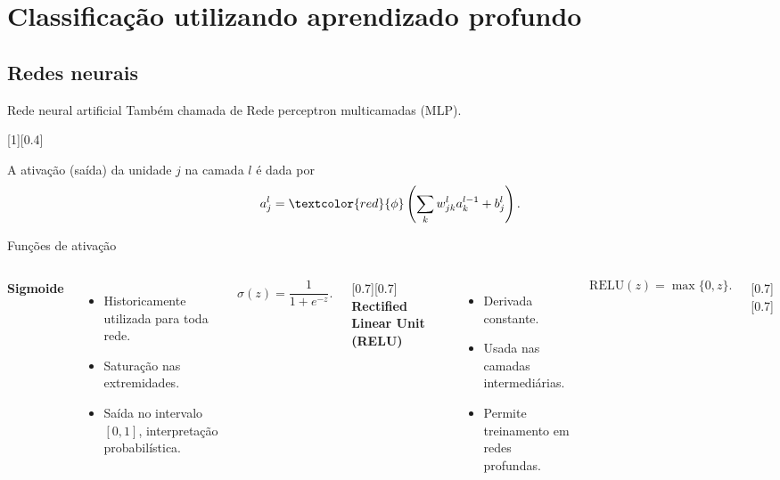\section{Classificação utilizando aprendizado profundo}

\subsection{Redes neurais}

\begin{frame}{Rede neural artificial}
	Também chamada de Rede perceptron multicamadas (MLP).

	[0.4]

	A ativação (saída) da unidade $j$ na camada $l$ é dada por
	\begin{equation}
	a^l_j = \textcolor{red}{\phi} \left( \sum_k w_{jk}^l a_k^{l-1} + b_j^l \right).
	\end{equation}
\end{frame}

\begin{frame}{Funções de ativação}
	\begin{columns}[T]
		\textbf{Sigmoide}
		\begin{itemize}
			\item Historicamente utilizada para toda rede.
			\item Saturação nas extremidades.
			\item Saída no intervalo $[0,1]$, interpretação probabilística.
		\end{itemize}

		\begin{equation*}
		\sigma(z) = \frac{1}{1+e^{-z}}.
		\end{equation*}

		[0.7][0.7]
		\textbf{Rectified Linear Unit (RELU)}
		\begin{itemize}
			\item Derivada constante.
			\item Usada nas camadas intermediárias.
			\item Permite treinamento em redes profundas.
		\end{itemize}

		\begin{equation*}
			\text{RELU}(z) = \max\{0,z\}.
		\end{equation*}

		[0.7][0.7]
	\end{columns}
\end{frame}

